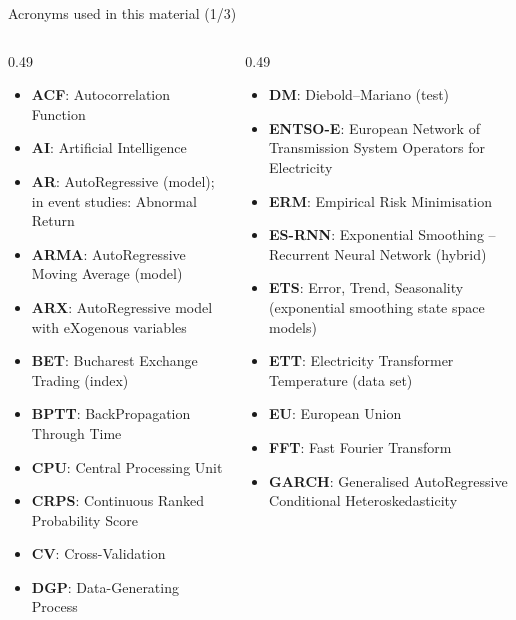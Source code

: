 \begin{frame}{Acronyms used in this material (1/3)}
\begin{columns}[T]
\begin{column}{0.49\textwidth}
\begin{itemize}\setlength{\itemsep}{0pt}
    \item \textbf{ACF}: Autocorrelation Function
    \item \textbf{AI}: Artificial Intelligence
    \item \textbf{AR}: AutoRegressive (model); in event studies: Abnormal Return
    \item \textbf{ARMA}: AutoRegressive Moving Average (model)
    \item \textbf{ARX}: AutoRegressive model with eXogenous variables
    \item \textbf{BET}: Bucharest Exchange Trading (index)
    \item \textbf{BPTT}: BackPropagation Through Time
    \item \textbf{CPU}: Central Processing Unit
    \item \textbf{CRPS}: Continuous Ranked Probability Score
    \item \textbf{CV}: Cross-Validation
    \item \textbf{DGP}: Data-Generating Process
\end{itemize}
\end{column}
\begin{column}{0.49\textwidth}
\begin{itemize}\setlength{\itemsep}{0pt}
    \item \textbf{DM}: Diebold–Mariano (test)
    \item \textbf{ENTSO-E}: European Network of Transmission System Operators for Electricity
    \item \textbf{ERM}: Empirical Risk Minimisation
    \item \textbf{ES-RNN}: Exponential Smoothing – Recurrent Neural Network (hybrid)
    \item \textbf{ETS}: Error, Trend, Seasonality (exponential smoothing state space models)
    \item \textbf{ETT}: Electricity Transformer Temperature (data set)
    \item \textbf{EU}: European Union
    \item \textbf{FFT}: Fast Fourier Transform
    \item \textbf{GARCH}: Generalised AutoRegressive Conditional Heteroskedasticity
\end{itemize}
\end{column}
\end{columns}
\end{frame}
